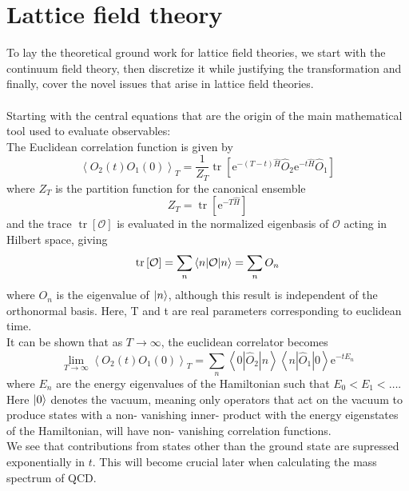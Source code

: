 \documentclass[a4paper,10pt]{book}
\begin{document}
\section{Lattice field theory}
To lay the theoretical ground work for lattice field theories, we start with the continuum field theory, then discretize it while justifying the transformation and finally, cover the novel issues that arise in lattice field theories.\\\\Starting with the central equations that are the origin of the main mathematical tool used to evaluate observables:\\
The Euclidean correlation function is given by
\begin{equation}\label{eq:first}
\left\langle O_{2}(t) O_{1}(0)\right\rangle_{T}=\frac{1}{Z_{T}} \operatorname{tr}\left[\mathrm{e}^{-(T-t) \hat{H}} \widehat{O}_{2} \mathrm{e}^{-t \hat{H}} \widehat{O}_{1}\right]
\end{equation}
where $Z_T$ is the partition function for the canonical ensemble
\begin{equation}
Z_{T}=\operatorname{tr}\left[\mathrm{e}^{-T \widehat{H}}\right]
\end{equation}
and the trace $\operatorname{tr}\left[\mathcal{O}\right]$ is evaluated in the normalized eigenbasis of $\mathcal{O}$ acting in Hilbert space, giving
\begin{equation}
\operatorname{tr}\left[\mathcal{O}\right] = \sum\limits_n \braket{n|\mathcal{O}|n} = \sum\limits_n O_n
\end{equation}
where $O_n$ is the eigenvalue of $\ket{n}$, although this result is independent of the orthonormal basis. Here, T and t are real parameters corresponding to euclidean time.\\It can be shown that as $T\rightarrow \infty$, the euclidean correlator becomes 
\begin{equation}
\lim _{T \rightarrow \infty}\left\langle O_{2}(t) O_{1}(0)\right\rangle_{T}=\sum_{n}\left\langle 0\left|\widehat{O}_{2}\right| n\right\rangle\left\langle n\left|\widehat{O}_{1}\right| 0\right\rangle \mathrm{e}^{-t E_{n}}
\end{equation}
where $E_{n}$ are the energy eigenvalues of the Hamiltonian such that $E_0 < E_1 <\ldots$. Here $\ket{0}$ denotes the vacuum, meaning only operators that act on the vacuum to produce states with a non- vanishing inner- product with the energy eigenstates of the Hamiltonian, will have non- vanishing correlation functions.\\ We see that contributions from states other than the ground state are supressed exponentially in $t$. This will become crucial later when calculating the mass spectrum of QCD.
\end{document}
